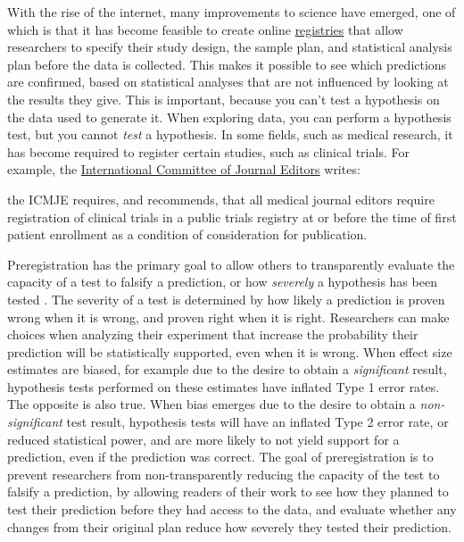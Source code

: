 \documentclass[
  oneside]{krantz}
\renewenvironment{quote}{\begin{VF}}{\end{VF}}
\begin{document}
With the rise of the internet, many improvements to science have emerged, one of which is that it has become feasible to create online \href{https://en.wikipedia.org/wiki/List_of_clinical_trial_registries}{registries} that allow researchers to specify their study design, the sample plan, and statistical analysis plan before the data is collected. This makes it possible to see which predictions are confirmed, based on statistical analyses that are not influenced by looking at the results they give. This is important, because you can't test a hypothesis on the data used to generate it. When exploring data, you can perform a hypothesis test, but you cannot \emph{test} a hypothesis. In some fields, such as medical research, it has become required to register certain studies, such as clinical trials. For example, the \href{https://www.icmje.org/icmje-recommendations.pdf}{International Committee of Journal Editors} writes:

\begin{quote}
the ICMJE requires, and recommends, that all medical journal editors require registration of clinical trials in a public trials registry at or before the time of first patient enrollment as a condition of consideration for publication.
\end{quote}

Preregistration has the primary goal to allow others to transparently evaluate the capacity of a test to falsify a prediction, or how \emph{severely} a hypothesis has been tested \citep{lakens_value_2019}. The severity of a test is determined by how likely a prediction is proven wrong when it is wrong, and proven right when it is right. Researchers can make choices when analyzing their experiment that increase the probability their prediction will be statistically supported, even when it is wrong. When effect size estimates are biased, for example due to the desire to obtain a \emph{significant} result, hypothesis tests performed on these estimates have inflated Type 1 error rates. The opposite is also true. When bias emerges due to the desire to obtain a \emph{non-significant} test result, hypothesis tests will have an inflated Type 2 error rate, or reduced statistical power, and are more likely to not yield support for a prediction, even if the prediction was correct. The goal of preregistration is to prevent researchers from non-transparently reducing the capacity of the test to falsify a prediction, by allowing readers of their work to see how they planned to test their prediction before they had access to the data, and evaluate whether any changes from their original plan reduce how severely they tested their prediction.
\end{document}
